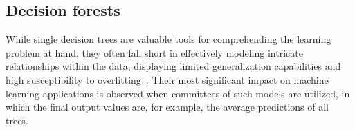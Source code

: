 %
%
%
%


\subsection{Decision forests}
\label{sec:decision forests}

While single decision trees are valuable tools for comprehending the learning problem at hand, they often fall short in effectively modeling intricate relationships within the data, displaying limited generalization capabilities and high susceptibility to overfitting~\cite{breiman2001random,chen2016xgboost}.  %
%
Their most significant impact on machine learning applications is observed when committees of such models are utilized, in which the final output values
are, for example, the average predictions of all trees.

